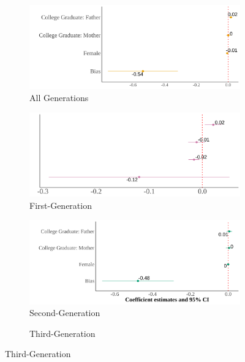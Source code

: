 \documentclass[12pt,english]{article}
\begin{document}
\begin{center}
\begin{figure}[!htb]
\centering
\caption{Relationship Between Self-Reported Asian Identity and Bias: By Generation}
\label{plot01-regression-gen}
\begin{subfigure}{.48\textwidth}
\caption{All Generations}
\centering
\includegraphics[width=.9\linewidth]{figure/skin-iat-regression-all-gens.png}
\end{subfigure}
\centering
\begin{subfigure}{.48\textwidth}
\caption{First-Generation}
\centering
\includegraphics[width=.9\linewidth]{figure/skin-iat-regression-first-gen.png}
\end{subfigure}
\begin{subfigure}{.48\textwidth}
\caption{Second-Generation}
\centering
\includegraphics[width=.9\linewidth]{figure/skin-iat-regression-second-gen.png}
\end{subfigure}
\begin{subfigure}{.48\textwidth}
\caption{Third-Generation}

\end{subfigure}
\end{figure}
\end{center}
\end{document}
